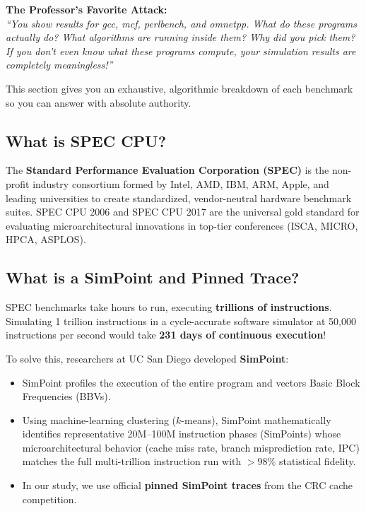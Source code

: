 \documentclass[11pt, a4paper]{article}
\begin{document}
\begin{trapbox}
\textbf{The Professor's Favorite Attack:}\\
\textit{``You show results for gcc, mcf, perlbench, and omnetpp. What do these programs actually do? What algorithms are running inside them? Why did you pick them? If you don't even know what these programs compute, your simulation results are completely meaningless!''}
\end{trapbox}

This section gives you an exhaustive, algorithmic breakdown of each benchmark so you can answer with absolute authority.

\subsection{What is SPEC CPU?}
The \textbf{Standard Performance Evaluation Corporation (SPEC)} is the non-profit industry consortium formed by Intel, AMD, IBM, ARM, Apple, and leading universities to create standardized, vendor-neutral hardware benchmark suites. SPEC CPU 2006 and SPEC CPU 2017 are the universal gold standard for evaluating microarchitectural innovations in top-tier conferences (ISCA, MICRO, HPCA, ASPLOS).

\subsection{What is a SimPoint and Pinned Trace?}
SPEC benchmarks take hours to run, executing \textbf{trillions of instructions}. Simulating 1 trillion instructions in a cycle-accurate software simulator at 50,000 instructions per second would take \textbf{231 days of continuous execution}!

To solve this, researchers at UC San Diego developed \textbf{SimPoint}:
\begin{itemize}[leftmargin=1.5em]
  \item SimPoint profiles the execution of the entire program and vectors Basic Block Frequencies (BBVs).
  \item Using machine-learning clustering ($k$-means), SimPoint mathematically identifies representative 20M--100M instruction phases (SimPoints) whose microarchitectural behavior (cache miss rate, branch misprediction rate, IPC) matches the full multi-trillion instruction run with $>98\%$ statistical fidelity.
  \item In our study, we use official \textbf{pinned SimPoint traces} from the CRC cache competition.
\end{itemize}
\end{document}
